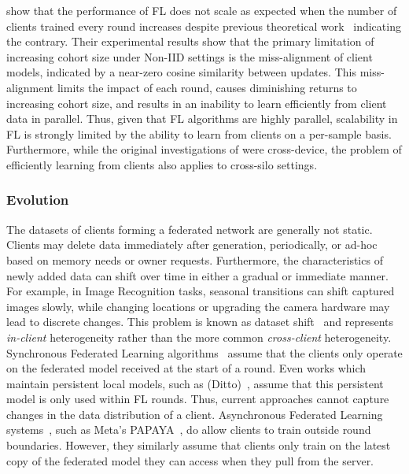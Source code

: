\citet{LargeCohorts} show that the performance of FL does not scale as expected when the number of clients trained every round increases despite previous theoretical work~\citep{TighterTheory} indicating the contrary. Their experimental results show that the primary limitation of increasing cohort size under Non-IID settings is the miss-alignment of client models, indicated by a near-zero cosine similarity between updates. This miss-alignment limits the impact of each round, causes diminishing returns to increasing cohort size, and results in an inability to learn efficiently from client data in parallel. Thus, given that FL algorithms are highly parallel, scalability in FL is strongly limited by the ability to learn from clients on a per-sample basis. Furthermore, while the original investigations of \citet{ScaleSystemDesign,LargeCohorts} were cross-device, the problem of efficiently learning from clients also applies to cross-silo settings.


\subsubsection{Evolution}
The datasets of clients forming a federated network are generally not static. Clients may delete data immediately after generation, periodically, or ad-hoc based on memory needs or owner requests. Furthermore, the characteristics of newly added data can shift over time in either a gradual or immediate manner. For example, in Image Recognition tasks, seasonal transitions can shift captured images slowly, while changing locations or upgrading the camera hardware may lead to discrete changes. This problem is known as dataset shift~\citep[sec. 3.1]{AdvancedAndOpenProblems} and represents \emph{in-client} heterogeneity rather than the more common \emph{cross-client} heterogeneity. Synchronous Federated Learning algorithms~\citep{FedAvg,FedOPT,FedMA,QFedAvg,TERM} assume that the clients only operate on the federated model received at the start of a round. Even works which maintain persistent local models, such as (Ditto)~\citep{Ditto}, assume that this persistent model is only used within FL rounds. Thus, current approaches cannot capture changes in the data distribution of a client. Asynchronous Federated Learning systems~\citep{AsynchronousFLonHetDevicesSurvey,FedBuff,AsyncrhonousOnlineFL}, such as Meta's PAPAYA~\citep{PAPAYA}, do allow clients to train outside round boundaries. However, they similarly assume that clients only train on the latest copy of the federated model they can access when they pull from the server.

